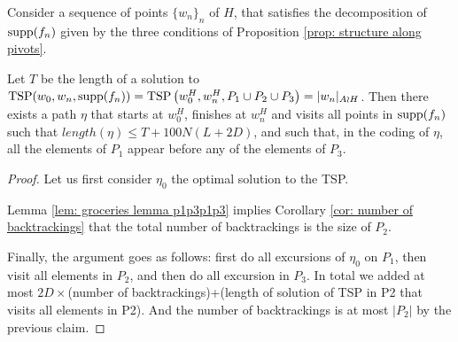 \begin{lem}
	Consider a sequence of points $\{w_n\}_n$ of $H$, that satisfies the decomposition of $\mathrm{supp}(f_n)$ given by the three conditions of Proposition \ref{prop: structure along pivots}.
	
	Let $T$ be the length of a solution to $\mathrm{TSP}(w_0,w_n,\mathrm{supp}(f_n))=\mathrm{TSP}\left(w^H_0,w^H_n,P_1\cup P_2\cup P_3\right)=|w_n|_{A \wr H}$. Then there exists a path $\eta$ that starts at $w^H_0$, finishes at $w^H_n$ and visits all points in $\mathrm{supp}(f_n)$ such that $length(\eta)\le T+100 N (L+2D)$, and such that, in the coding of $\eta$, all the elements of $P_1$ appear before any of the elements of $P_3$.
	
\end{lem}
\begin{proof}
	
	Let us first consider $\eta_0$ the optimal solution to the TSP. 
	
	
	Lemma \ref{lem: groceries lemma p1p3p1p3} implies Corollary \ref{cor: number of backtrackings} that the total number of backtrackings is the size of $P_2$.
	
	Finally, the argument goes as follows: first do all excursions of $\eta_0$ on $P_1$, then visit all elements in $P_2$, and then do all excursion in $P_3$. In total we added at most $2D\times$(number of backtrackings)+(length of solution of TSP in P2 that visits all elements in P2). And the number of backtrackings is at most $|P_2|$ by the previous claim.
	
\end{proof}
